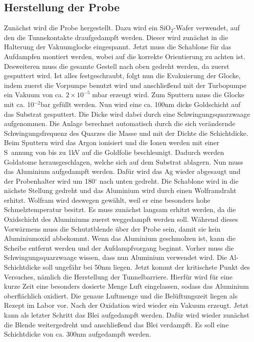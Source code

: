 \documentclass[twoside,        %
               BCOR12mm,       %
               english,ngerman, %
               fleqn,headsepline=false,footsepline=false
              ]{Vorlage/MFPREPORT}
\begin{document}
\subsection{Herstellung der Probe}
Zunächst wird die Probe hergestellt. Dazu wird ein SiO$_2$-Wafer verwendet,
auf den die Tunnekontakte draufgedampft werden. Dieser wird zunächst in die
Halterung der Vakuumglocke eingespannt. Jetzt muss die Schablone für das
Aufdampfen montiert werden, wobei auf die korrekte Orientierung zu achten ist.
Desweiteren muss die gesamte Gestell nach oben gedreht werden, da zuerst
gesputtert wird.
Ist alles festgeschraubt, folgt nun die Evakuierung der Glocke, indem zuerst
die Vorpumpe benutzt wird und anschließend mit der
Turbopumpe ein Vakuum von ca. $2\times10^{-5}\;$mbar erzeugt wird.
Zum Sputtern muss die Glocke mit ca. 10$^{-2}$\;bar gefüllt werden.
Nun wird eine ca. 100\;nm dicke Goldschicht auf das Substrat gesputtert. Die
Dicke wird dabei durch eine Schwingungsquarzwaage aufgenommen. Die Anlage
berechnet automatisch durch die sich verändernde Schwingungsfrequenz des
Quarzes die Masse und mit der Dichte die Schichtdicke. Beim Sputtern wird das
Argon ionisiert und die Ionen werden mit einer S~annung von bis zu 1\;kV auf
die Goldfolie beschleunigt. Dadurch werden Goldatome herausgeschlagen, welche
sich auf dem Substrat ablagern. 
Nun muss das Aluminium aufgedampft werden.  Dafür wird das Ag wieder abgesaugt
und der Probenhalter wird um 180$^\circ$ nach unten gedreht. Die Schablone wird
in die nächste Stellung gedreht und das Aluminium wird durch einen Wolframdraht
erhitzt. Wolfram wird deswegen gewählt, weil er eine besonders hohe
Schmelztemperatur besitzt. Es muss zunächst langsam erhitzt werden, da die
Oxidschicht des Aluminiums zuerst weggedampft werden soll. Während dieses
Vorwärmens muss die Schutztblende über der Probe sein, damit sie kein
Aluminiumoxid abbekommt. Wenn das Aluminium geschmolzen ist, kann die Scheibe
entfernt werden und der Aufdampfvorgang beginnt. Vorher muss die
Schwingungsquarzwaage wissen, dass nun Aluminium verwendet wird.
Die Al-Schichtdicke soll ungefähr bei 50\;nm liegen.
Jetzt kommt der kritischste Punkt des Versuches, nämlich die Herstellung der
Tunnelbarriere. Hierfür wird für eine kurze Zeit eine besonders dosierte Menge
Luft eingelassen, sodass das Aluminium oberflächlich oxidiert. Die genaue
Luftmenge und die Belüftungszeit liegen als Rezept im Labor vor.
Nach der Oxidation wird wieder ein Vakuum erzeugt. Jetzt kann als letzter
Schritt das Blei aufgedampft werden. Dafür wird wieder zunächst die Blende
weitergedreht und anschließend das Blei verdampft. Es soll eine Schichtdicke
von ca. 300\;nm aufgedampft werden.
\end{document}
